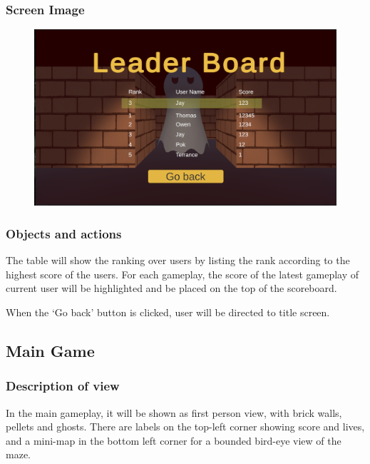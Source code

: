 \documentclass[11pt]{article}
\begin{document}
\subsubsection{Screen Image}
\begin{figure}[H]
    \centering
    \includegraphics*[scale=0.2]{UI1.3ScoreBoard.png}
\end{figure}
\subsubsection{Objects and actions}
The table will show the ranking over users by listing the rank according to the highest score of the users. For each gameplay, the score of the latest gameplay of current user will be highlighted and be placed on the top of the scoreboard.

When the `Go back' button is clicked, user will be directed to title screen.

\subsection{Main Game}
\subsubsection{Description of view}
In the main gameplay, it will be shown as first person view, with brick walls, pellets and ghosts. There are labels on the top-left corner showing score and lives, and a mini-map in the bottom left corner for a bounded bird-eye view of the maze. 
\end{document}

